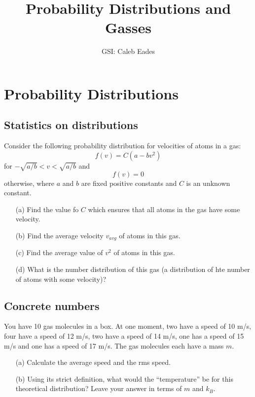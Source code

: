 \documentclass{article}
\begin{document}
	
\title{Probability Distributions and Gasses}
\author{GSI: Caleb Eades}
\maketitle

\section{Probability Distributions}

\subsection{Statistics on distributions}

Consider the following probability distribution for velocities of atoms in a gas:
\begin{equation}
f(v) = C(a-bv^2)
\end{equation}
for $-\sqrt{a/b} < v < \sqrt{a/b}$ and
\begin{equation}
f(v) = 0
\end{equation}
otherwise, where $a$ and $b$ are fixed positive constants and $C$ is an unknown constant.
\begin{itemize}
	\item[(a)] Find the value fo $C$ which ensures that all atoms in the gas have some velocity.
	\item[(b)] Find the average velocity $v_{avg}$ of atoms in this gas.
	\item[(c)] Find the average value of $v^2$ of atoms in this gas.
	\item[(d)] What is the number distribution of this gas (a distribution of hte number of atoms with some velocity)?
\end{itemize}

\subsection{Concrete numbers}

You have 10 gas molecules in a box. At one moment, two have a speed of 10 m/s, four have a speed of 12 m/s, two have a speed of 14 m/s, one has a speed of 15 m/s and one has a speed of 17 m/s. The gas molecules each have a mass $m$.
\begin{itemize}
	\item[(a)] Calculate the average speed and the rms speed.
	\item[(b)] Using its strict definition, what would the ``temperature'' be for this theoretical distribution? Leave your answer in terms of $m$ and $k_B$.
\end{itemize}
\end{document}
